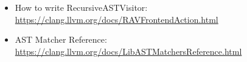 \begin{itemize}
\item
How to write RecursiveASTVisitor: \url{https://clang.llvm.org/docs/RAVFrontendAction.html}

\item
AST Matcher Reference: \url{https://clang.llvm.org/docs/LibASTMatchersReference.html}
\end{itemize}